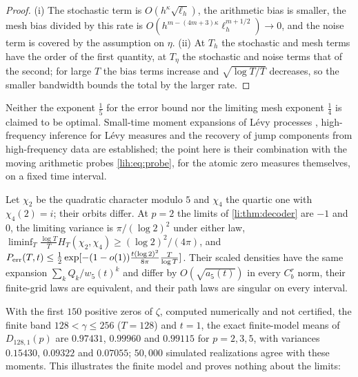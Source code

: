 \begin{proof}
(i) The stochastic term is $O(h^\kappa\sqrt{\ell_h})$, the arithmetic bias is smaller, the mesh bias divided by this
rate is $O(h^{m-(4m+3)\kappa}\ell_h^{m+1/2})\to0$, and the noise term is covered by the assumption on $\eta$. (ii) At $T_h$
the stochastic and mesh terms have the order of the first quantity, at $T_\eta$ the stochastic and noise
terms that of the second; for large $T$ the bias terms increase and $\sqrt{\log T/T}$ decreases, so the smaller
bandwidth bounds the total by the larger rate.
\end{proof}

Neither the exponent $\frac15$ for the error bound nor the limiting mesh exponent $\frac14$ is claimed to be
optimal. Small-time moment expansions of L\'evy processes \cite{FigueroaLopez2008Small}, high-frequency
inference for L\'evy measures \cite{NicklReissSohlTrabs2016High} and the recovery of jump components from
high-frequency data \cite{GonzalezCazaresIvanovs2021Recovering} are established; the point here is
their combination with the moving arithmetic probes \eqref{lih:eq:probe}, for the atomic zero measures
themselves, on a fixed time interval.

\begin{example}\label{li:ex:five}
Let $\chi_2$ be the quadratic character modulo $5$ and $\chi_4$ the quartic one with $\chi_4(2)=i$; their orbits
differ. At $p=2$ the limits of \cref{li:thm:decoder} are $-1$ and $0$, the limiting variance is
$\pi/(\log2)^2$ under either law, $\liminf_T\frac{\log T}TH_T(\chi_2,\chi_4)\ge(\log2)^2/(4\pi)$, and
$P_{\rm err}(T,t)\le\frac12\exp[-(1-o(1))\frac{t(\log2)^2}{8\pi}\frac T{\log T}]$. Their scaled densities have the same
expansion $\sum_kQ_k/w_5(t)^k$ and differ by $O(\sqrt{a_5(t)})$ in every $C^r_b$ norm, their finite-grid laws are
equivalent, and their path laws are singular on every interval.
\end{example}

\begin{remark}\label{li:rem:illustration}
With the first $150$ positive zeros of $\zeta$, computed numerically and not certified, the finite
band $128<\gamma\le256$ ($T=128$) and $t=1$, the exact finite-model means of $D_{128,1}(p)$ are $0.97431$, $0.99960$
and $0.99115$ for $p=2,3,5$, with variances $0.15430$, $0.09322$ and $0.07055$; $50{,}000$ simulated
realizations agree with these moments. This illustrates the finite model and proves nothing about the
limits:
\begin{center}
\end{center}
\end{remark}

